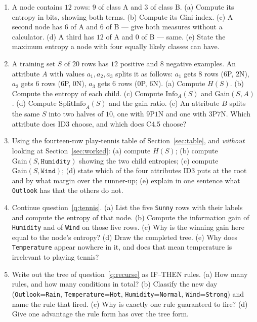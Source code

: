 \documentclass[11pt]{article}
\begin{document}
\begin{enumerate}[leftmargin=*]
  \item\label{q:entropy} A node contains $12$ rows: $9$ of class A and $3$ of
    class B. (a) Compute its entropy in bits, showing both terms. (b) Compute
    its Gini index. (c) A second node has $6$ of A and $6$ of B --- give both
    measures without a calculator. (d) A third has $12$ of A and $0$ of B ---
    same. (e) State the maximum entropy a node with four equally likely
    classes can have.

  \item\label{q:gain} A training set $S$ of $20$ rows has $12$ positive and
    $8$ negative examples. An attribute $A$ with values
    $a_1, a_2, a_3$ splits it as follows: $a_1$ gets $8$ rows ($6$P, $2$N),
    $a_2$ gets $6$ rows ($6$P, $0$N), $a_3$ gets $6$ rows ($0$P, $6$N).
    (a) Compute $H(S)$. (b) Compute the entropy of each child. (c) Compute
    $\mathrm{Info}_A(S)$ and $\mathrm{Gain}(S,A)$. (d) Compute
    $\mathrm{SplitInfo}_A(S)$ and the gain ratio. (e) An attribute $B$ splits
    the same $S$ into two halves of $10$, one with $9$P$1$N and one with
    $3$P$7$N. Which attribute does ID3 choose, and which does C4.5 choose?

  \item\label{q:tennis} Using the fourteen-row play-tennis table of
    Section~\ref{sec:table}, and \emph{without} looking at
    Section~\ref{sec:worked}: (a) compute $H(S)$; (b) compute
    $\mathrm{Gain}(S, \texttt{Humidity})$ showing the two child entropies;
    (c) compute $\mathrm{Gain}(S, \texttt{Wind})$; (d) state which of the four
    attributes ID3 puts at the root and by what margin over the runner-up;
    (e) explain in one sentence what \texttt{Outlook} has that the others do
    not.

  \item\label{q:recurse} Continue question~\ref{q:tennis}. (a) List the five
    \texttt{Sunny} rows with their labels and compute the entropy of that
    node. (b) Compute the information gain of \texttt{Humidity} and of
    \texttt{Wind} on those five rows. (c) Why is the winning gain here equal
    to the node's entropy? (d) Draw the completed tree. (e) Why does
    \texttt{Temperature} appear nowhere in it, and does that mean temperature
    is irrelevant to playing tennis?

  \item\label{q:rules} Write out the tree of question~\ref{q:recurse} as
    IF--THEN rules. (a) How many rules, and how many conditions in total?
    (b) Classify the new day (\texttt{Outlook}=\texttt{Rain},
    \texttt{Temperature}=\texttt{Hot}, \texttt{Humidity}=\texttt{Normal},
    \texttt{Wind}=\texttt{Strong}) and name the rule that fired. (c) Why is
    exactly one rule guaranteed to fire? (d) Give one advantage the rule form
    has over the tree form.


\end{enumerate}
\end{document}

